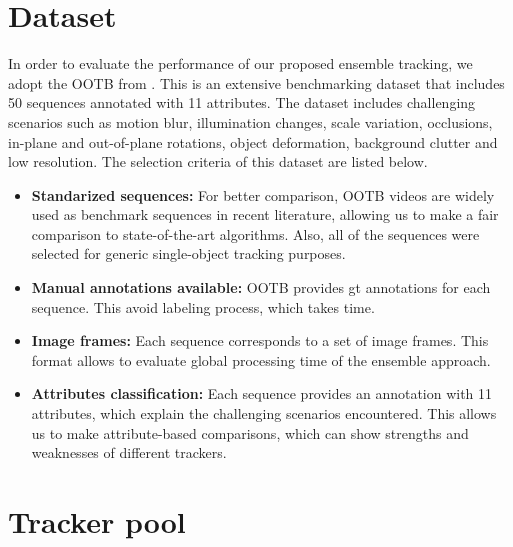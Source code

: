 \section{Dataset}
In order to evaluate the performance of our proposed ensemble tracking,
we adopt the OOTB from \cite{Wu2013B}.
This is an extensive benchmarking dataset that includes 50 sequences
annotated with 11 attributes.
The dataset includes challenging scenarios such as motion blur,
illumination changes, scale variation, occlusions,
in-plane and out-of-plane rotations, object deformation,
background clutter and low resolution. The selection criteria of this dataset
are listed below. 
\begin{itemize}
\item \textbf{Standarized sequences: }For better comparison, OOTB videos are
widely used as benchmark sequences in recent literature, allowing us to make a
fair comparison to state-of-the-art algorithms. Also, all of the sequences were
selected for generic single-object tracking purposes.
\item \textbf{Manual annotations available: }OOTB provides \gls{gt} annotations for
each sequence. This avoid labeling process, which takes time.
\item \textbf{Image frames: } Each sequence corresponds to a set of image frames. This
format allows to evaluate global processing time of the ensemble approach.
\item \textbf{Attributes classification: } Each sequence provides an annotation with 11
attributes, which explain the challenging scenarios encountered. This
allows us to make attribute-based comparisons, which can show strengths and weaknesses of different trackers.

\end{itemize}

\section{Tracker pool}

